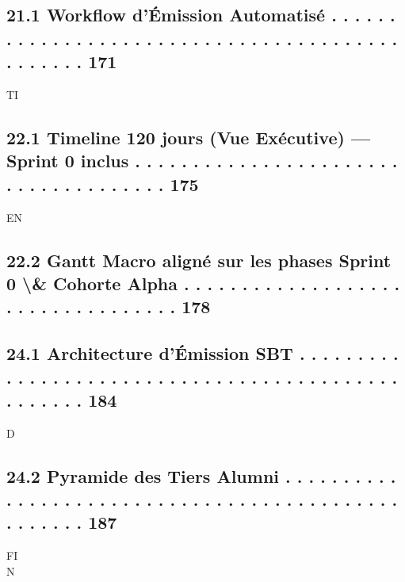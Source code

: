 \documentclass[12pt,landscape,a4paper]{article}
\begin{document}
\subsection{21.1 Workflow d’Émission Automatisé      . . . . . . . . . . . . . . . . . . . . . . . . . . . . . . . . . . . . . . . . . . . . . . . 171}
\vspace{0.5em}
\vspace{0.5em}
\vspace{0.5em}
\vspace{0.5em}
TI\\
\subsection{22.1 Timeline 120 jours (Vue Exécutive) — Sprint 0 inclus . . . . . . . . . . . . . . . . . . . . . . . . . . . . . . . . . . . . . 175}
\vspace{0.5em}
\vspace{0.5em}
\vspace{0.5em}
\vspace{0.5em}
EN\\
\subsection{22.2 Gantt Macro aligné sur les phases Sprint 0 \textbackslash{}& Cohorte Alpha . . . . . . . . . . . . . . . . . . . . . . . . . . . . . . . . . . 178}
\vspace{0.5em}
\subsection{24.1 Architecture d’Émission SBT . . . . . . . . . . . . . . . . . . . . . . . . . . . . . . . . . . . . . . . . . . . . . . . . . . 184}
\vspace{0.5em}
\vspace{0.5em}
\vspace{0.5em}
\vspace{0.5em}
D\\
\subsection{24.2 Pyramide des Tiers Alumni . . . . . . . . . . . . . . . . . . . . . . . . . . . . . . . . . . . . . . . . . . . . . . . . . . . 187}
\vspace{0.5em}
\vspace{0.5em}
\vspace{0.5em}
\vspace{0.5em}
FI\\
N\\
\end{document}
